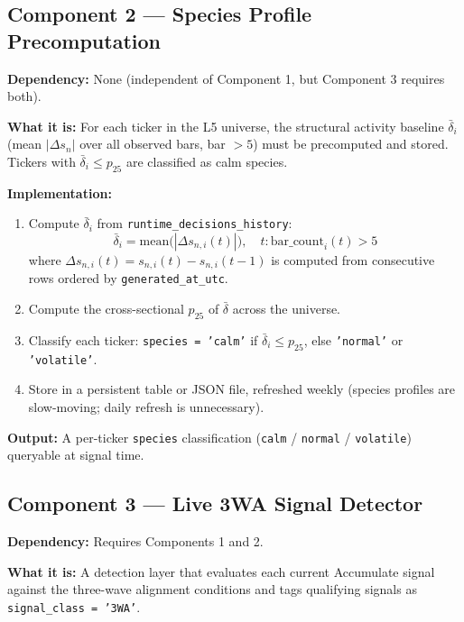 \documentclass[11pt, a4paper]{article}
\theoremstyle{definition}
\begin{document}
\subsection{Component 2 — Species Profile Precomputation}
\label{sec:impl2}

\textbf{Dependency:} None (independent of Component 1, but Component 3
requires both).

\textbf{What it is:}
For each ticker in the L5 universe, the structural activity baseline
$\bar{\delta}_i$ (mean $|\Delta s_n|$ over all observed bars, bar $> 5$)
must be precomputed and stored.
Tickers with $\bar{\delta}_i \leq p_{25}$ are classified as calm species.

\textbf{Implementation:}
\begin{enumerate}
  \item Compute $\bar{\delta}_i$ from \texttt{runtime\_decisions\_history}:
        \[
          \bar{\delta}_i = \text{mean}\bigl(|\Delta s_{n,i}(t)|\bigr), \quad
          t : \text{bar\_count}_i(t) > 5
        \]
        where $\Delta s_{n,i}(t) = s_{n,i}(t) - s_{n,i}(t-1)$ is computed
        from consecutive rows ordered by \texttt{generated\_at\_utc}.
  \item Compute the cross-sectional $p_{25}$ of $\bar{\delta}$ across the universe.
  \item Classify each ticker: \texttt{species = 'calm'} if
        $\bar{\delta}_i \leq p_{25}$, else \texttt{'normal'} or \texttt{'volatile'}.
  \item Store in a persistent table or JSON file, refreshed weekly
        (species profiles are slow-moving; daily refresh is unnecessary).
\end{enumerate}

\textbf{Output:} A per-ticker \texttt{species} classification
(\texttt{calm} / \texttt{normal} / \texttt{volatile}) queryable at signal time.

\subsection{Component 3 — Live 3WA Signal Detector}
\label{sec:impl3}

\textbf{Dependency:} Requires Components 1 and 2.

\textbf{What it is:}
A detection layer that evaluates each current Accumulate signal against the
three-wave alignment conditions and tags qualifying signals as
\texttt{signal\_class = '3WA'}.
\end{document}
